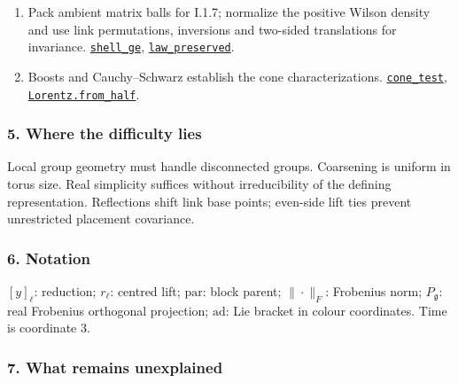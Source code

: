 \documentclass[
  letterpaper,
  11pt]{article}
\begin{document}
\begin{enumerate}
  \href{https://github.com/yang-mills-group/OpenAI-YM-20261028/blob/3456e5e75cf8d4cd558955a5c7638fba2d68f464/YM/Gauge/Nearest.lean\#L128-L139}{\texttt{nearest\_is\_focus}},
  \href{https://github.com/yang-mills-group/OpenAI-YM-20261028/blob/3456e5e75cf8d4cd558955a5c7638fba2d68f464/YM/Gauge/Casimir.lean\#L99-L125}{\texttt{invariant\_scalar}}.
\item
  Pack ambient matrix balls for I.1.7; normalize the positive Wilson
  density and use link permutations, inversions and two-sided
  translations for invariance.
  \href{https://github.com/yang-mills-group/OpenAI-YM-20261028/blob/3456e5e75cf8d4cd558955a5c7638fba2d68f464/YM/Gauge/Size.lean\#L80-L130}{\texttt{shell\_ge}},
  \href{https://github.com/yang-mills-group/OpenAI-YM-20261028/blob/3456e5e75cf8d4cd558955a5c7638fba2d68f464/YM/Wilson/Symmetry.lean\#L75-L91}{\texttt{law\_preserved}}.
\item
  Boosts and Cauchy--Schwarz establish the cone characterizations.
  \href{https://github.com/yang-mills-group/OpenAI-YM-20261028/blob/3456e5e75cf8d4cd558955a5c7638fba2d68f464/YM/Mink/Geometry.lean\#L113-L129}{\texttt{cone\_test}},
  \href{https://github.com/yang-mills-group/OpenAI-YM-20261028/blob/3456e5e75cf8d4cd558955a5c7638fba2d68f464/YM/Mink/Boost.lean\#L135-L158}{\texttt{Lorentz.from\_half}}.
\end{enumerate}

\subsubsection{5. Where the difficulty
lies}\label{where-the-difficulty-lies}

Local group geometry must handle disconnected groups. Coarsening is
uniform in torus size. Real simplicity suffices without irreducibility
of the defining representation. Reflections shift link base points;
even-side lift ties prevent unrestricted placement covariance.

\subsubsection{6. Notation}\label{notation}

\([y]_\ell\): reduction; \(r_\ell\): centred lift; \(\mathrm{par}\):
block parent; \(\|\cdot\|_F\): Frobenius norm; \(P_{\mathfrak g}\): real
Frobenius orthogonal projection; \(\mathrm{ad}\): Lie bracket in colour
coordinates. Time is coordinate \(3\).

\subsubsection{7. What remains
unexplained}\label{what-remains-unexplained}
\end{document}
